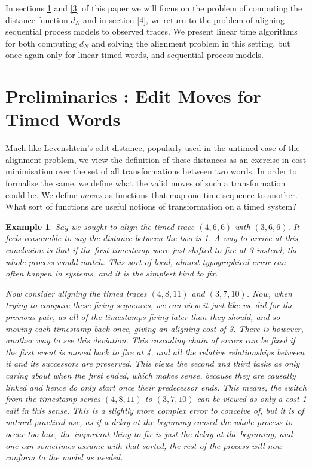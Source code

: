 \documentclass[conference]{IEEEtran}
\newtheorem{example}{Example}
\begin{document}
	In sections \ref{2} and \ref{3} of this paper we will focus on the problem of computing the distance function $d_N$ and in section \ref{4}, we return to the problem of aligning sequential process models to observed traces. We present linear time algorithms for both computing $d_N$ and solving the alignment problem in this setting, but once again only for linear timed words, and sequential process models.  
	
	\section{Preliminaries : Edit Moves for Timed Words}\label{2}
	
	Much like Levenshtein's edit distance, popularly used in the untimed case of the alignment problem, we view the definition of these distances as an exercise in cost minimisation over the set of all transformations between two words. 
	In order to formalise the same, we define what the valid moves of such a transformation could be. 
	We define \textit{moves} as functions that map one time sequence to another. 
	What sort of functions are useful notions of transformation on a timed system? 

	\begin{example}
		Say we sought to align the timed trace $(4,6,6)$ with $(3, 6, 6)$. 
		It feels reasonable to say the distance between the two is 1. 
		A way to arrive at this conclusion is that if the first timestamp  were just shifted to fire at 3 instead, the whole process would match. This sort of local, almost typographical error can often happen in systems, and it is the simplest kind to fix.  
		
		Now consider aligning the timed traces $(4, 8, 11)$ and $(3, 7, 10)$. 
		Now, when trying to compare these firing sequences, we can view it just like we did for the previous pair, as all of the timestamps firing later than they should, and so moving each timestamp back once, giving an aligning cost of 3. There is however, another way to see this deviation. This cascading chain of errors can be fixed if the first event is moved back to fire at 4, and all the relative relationships between it and its successors are preserved. This views the second and third tasks as only caring about when the first ended, which makes sense, because they are causally linked and hence do only start once their predecessor ends. This means, the switch from the timestamp series $(4, 8, 11)$ to $(3, 7, 10)$ can be viewed as only a cost 1 edit in this sense. This is a slightly more complex error to conceive of, but it is of natural practical use, as if a delay at the beginning caused the whole process to occur too late, the important thing to fix is just the delay at the beginning, and one can sometimes assume with that sorted, the rest of the process will now conform to the model as needed. 
	\end{example}
	
\end{document}
